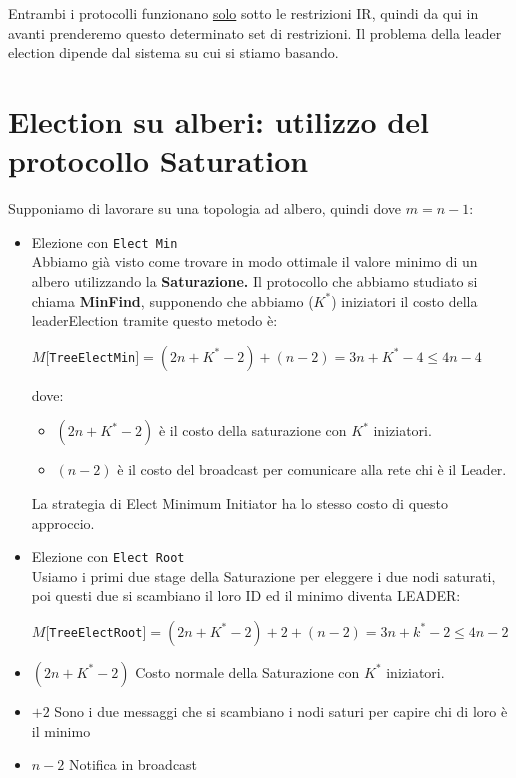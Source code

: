 Entrambi i protocolli funzionano \underline{solo} sotto le restrizioni IR,
quindi da qui in avanti prenderemo questo determinato set di restrizioni. Il
problema della leader election dipende dal sistema su cui si stiamo basando.

\section{Election su alberi: utilizzo del protocollo Saturation}
Supponiamo di lavorare su una topologia ad albero, quindi dove $m = n-1$:

\begin{itemize}
    \item Elezione con \texttt{Elect Min}\\
          Abbiamo già visto come trovare in modo ottimale il valore minimo di un
          albero utilizzando la \textbf{Saturazione.} Il protocollo che abbiamo
          studiato si chiama \textbf{MinFind}, supponendo che abbiamo ($K^*$)
          iniziatori il costo della leaderElection tramite questo metodo è:
          \begin{center}
              $M[$\texttt{TreeElectMin}$] = (2n + K^* -2) + (n-2) = 3n + K^* - 4
                  \leq 4n - 4$
          \end{center}
          dove:
          \begin{itemize}
              \item $(2n + K^* -2)$ è il costo della saturazione con $K^*$
                    iniziatori.
              \item $(n-2)$ è il costo del broadcast per comunicare alla rete chi è
                    il Leader.
          \end{itemize}

          La strategia di Elect Minimum Initiator ha lo stesso costo di questo
          approccio.
    \item Elezione con \texttt{Elect Root}\\
          Usiamo i primi due stage della Saturazione per eleggere i due nodi
          saturati, poi questi due si scambiano il loro ID ed il minimo diventa
          LEADER:
          \begin{center}
              $M[$\texttt{TreeElectRoot}$] = (2n + K^* -2) +2 + (n-2) = 3n + k^* - 2
                  \leq 4n - 2$
          \end{center}
\end{itemize}
\begin{itemize}
    \item $(2n + K^* -2)$ Costo normale della Saturazione con $K^*$ iniziatori.
    \item $+2$ Sono i due messaggi che si scambiano i nodi saturi per capire chi
          di loro è il minimo
    \item $n-2$ Notifica in broadcast
\end{itemize}


